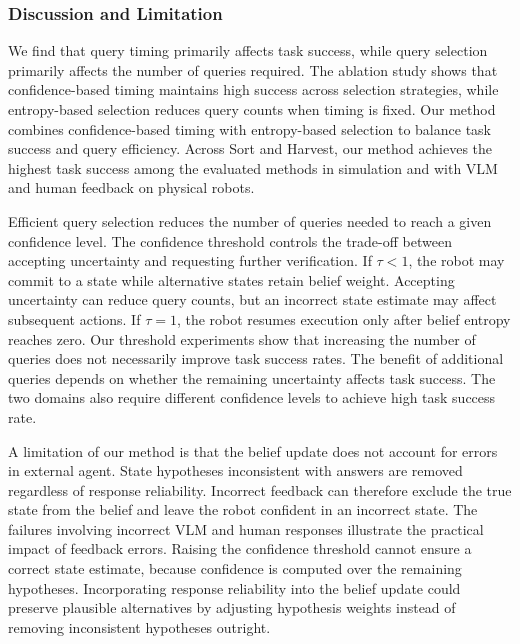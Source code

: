 \subsubsection{Discussion and Limitation}\label{exp:discussion}
We find that query timing primarily affects task success, while query selection primarily affects the number of queries required. The ablation study shows that confidence-based timing maintains high success across selection strategies, while entropy-based selection reduces query counts when timing is fixed. Our method combines confidence-based timing with entropy-based selection to balance task success and query efficiency. Across Sort and Harvest, our method achieves the highest task success among the evaluated methods in simulation and with VLM and human feedback on physical robots.



Efficient query selection reduces the number of queries needed to reach a given confidence level. The confidence threshold controls the trade-off between accepting uncertainty and requesting further verification. If $\tau<1$, the robot may commit to a state while alternative states retain belief weight. Accepting uncertainty can reduce query counts, but an incorrect state estimate may affect subsequent actions. If $\tau=1$, the robot resumes execution only after belief entropy reaches zero. Our threshold experiments show that increasing the number of queries does not necessarily improve task success rates. The benefit of additional queries depends on whether the remaining uncertainty affects task success. The two domains also require different confidence levels to achieve high task success rate. 



A limitation of our method is that the belief update does not account for errors in external agent. State hypotheses inconsistent with answers are removed regardless of response reliability. Incorrect feedback can therefore exclude the true state from the belief and leave the robot confident in an incorrect state. The failures involving incorrect VLM and human responses illustrate the practical impact of feedback errors. Raising the confidence threshold cannot ensure a correct state estimate, because confidence is computed over the remaining hypotheses. Incorporating response reliability into the belief update could preserve plausible alternatives by adjusting hypothesis weights instead of removing inconsistent hypotheses outright.

